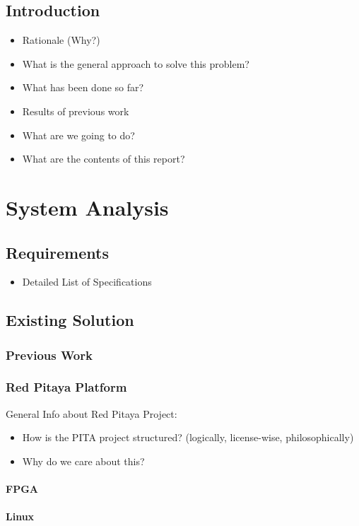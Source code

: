 \documentclass{alpenthesis/alpenthesis}
\begin{document}
\tableofcontents*

\chapter{Introduction}
\begin{itemize}\firmlist
    \item Rationale (Why?)
    \item What is the general approach to solve this problem?
    \item What has been done so far?
    \item Results of previous work
    \item What are we going to do?
    \item What are the contents of this report?
\end{itemize}

\part{System Analysis}
\chapter{Requirements}
\begin{itemize}\firmlist
    \item Detailed List of Specifications
\end{itemize}

\chapter{Existing Solution}
\section{Previous Work}
\section{Red Pitaya Platform}
General Info about Red Pitaya Project:
\begin{itemize}\firmlist
    \item How is the PITA project structured? (logically, license-wise, philosophically)
    \item Why do we care about this?
\end{itemize}
\subsection{FPGA}
\subsection{Linux}
\end{document}
